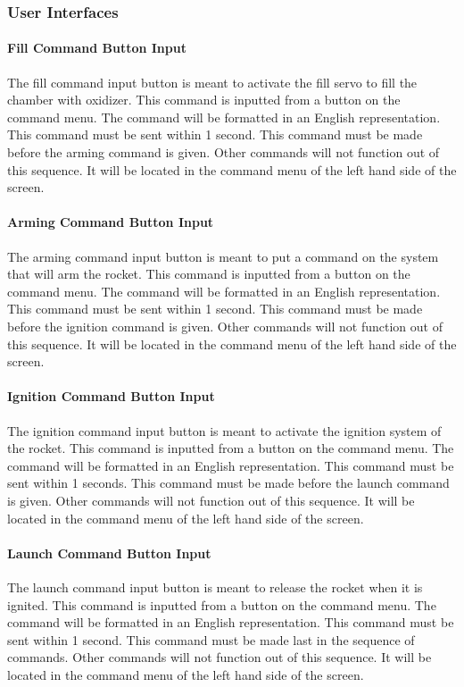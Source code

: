 \documentclass[10pt,draftclsnofoot,onecolumn,compsoc]{IEEEtran}
\begin{document}
\subsubsection{ User Interfaces}
\paragraph {\bf Fill Command Button Input}
The fill command input button is meant to activate the fill servo to fill the chamber with oxidizer. This command is inputted from a button on the command menu. The command will be formatted in an English representation.  This command must be sent within 1 second. This command must be made before the arming command is given. Other commands will not function out of this sequence. It will be located in the command menu of the left hand side of the screen.

\paragraph{\bf Arming Command Button Input}
The arming command input button is meant to put a command on the system that will arm the rocket. This command is inputted from a button on the command menu. The command will be formatted in an English representation.  This command must be sent within 1 second. This command must be made before the ignition command is given. Other commands will not function out of this sequence. It will be located in the command menu of the left hand side of the screen.
\paragraph{\bf Ignition Command Button Input}
The ignition command input button is meant to activate the ignition system of the rocket. This command is inputted from a button on the command menu. The command will be formatted in an English representation.  This command must be sent within 1 seconds. This command must be made before the launch command is given. Other commands will not function out of this sequence. It will be located in the command menu of the left hand side of the screen.
\paragraph{\bf Launch Command Button Input}
The launch command input button is meant to release the rocket when it is ignited. This command is inputted from a button on the command menu. The command will be formatted in an English representation.  This command must be sent within 1 second. This command must be made last in the sequence of commands. Other commands will not function out of this sequence. It will be located in the command menu of the left hand side of the screen.
\end{document}
